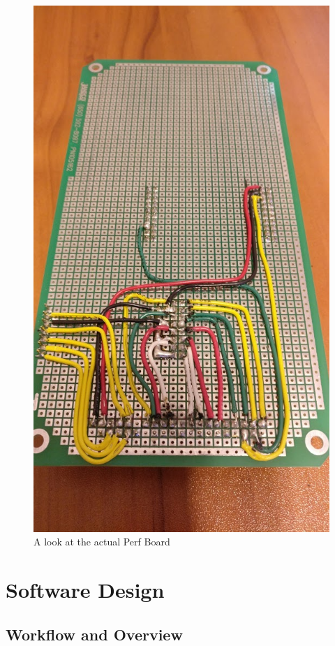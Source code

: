 \documentclass[a4paper, 12pt]{article}
\begin{document}
    \begin{figure}[H]
        \centering
        \includegraphics[scale=0.3]{pics/perfBoard}
        \caption{A look at the actual Perf Board}
        \label{fig:PerfSetup}
    \end{figure}

    \section{Software Design}

        \subsection{Workflow and Overview}
\end{document}
